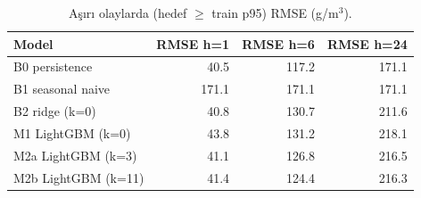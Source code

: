 \begin{table}[t]
\caption{Aşırı olaylarda (hedef $\geq$ train p95) RMSE (\textmu g/m$^3$).}
\label{tab:rq1_extreme}
\centering\footnotesize
\begin{tabular}{lrrr}
\toprule
Model & RMSE h=1 & RMSE h=6 & RMSE h=24 \\
\midrule
B0 persistence & 40.5 & 117.2 & 171.1 \\
B1 seasonal naive & 171.1 & 171.1 & 171.1 \\
B2 ridge (k=0) & 40.8 & 130.7 & 211.6 \\
M1 LightGBM (k=0) & 43.8 & 131.2 & 218.1 \\
M2a LightGBM (k=3) & 41.1 & 126.8 & 216.5 \\
M2b LightGBM (k=11) & 41.4 & 124.4 & 216.3 \\
\bottomrule
\end{tabular}
\end{table}
